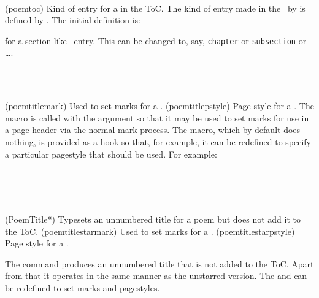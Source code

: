 \begin{syntax}
\cmd{\poemtoc} \\
\end{syntax}
\glossary(poemtoc)%
  {}%
  {Kind of entry for a  in the ToC.}
The kind of entry made in the \toc\ by 
\cmd{\PoemTitle} is defined by \cmd{\poemtoc}. The initial definition is: 
\begin{lcode}
\newcommand{\poemtoc}{section}
\end{lcode}
for a section-like \toc\ entry. This can be changed to, say, \texttt{chapter}
or \texttt{subsection} or \ldots.

\begin{syntax}
\cmd{\poemtitlemark} \\
\cmd{\poemtitlepstyle} \\
\end{syntax}
\glossary(poemtitlemark)%
  {}%
  {Used to set marks for a .}
\glossary(poemtitlepstyle)%
  {}%
  {Page style for a .}
    The macro \cmd{\poemtitlemark}
is called with the argument  so that it may be used
to set marks for use in a page header via the normal mark process. 
The \cmd{\poemtitlepstyle}
macro, which by default does nothing, is provided as a hook so that,
for example, it can be redefined to specify a particular pagestyle that should
be used. For example:
\begin{lcode}
\renewcommand*{\poemtitlemark}[1]{\markboth{#1}{#1}}
\renewcommand*{\poemtitlepstyle}{%
  \pagestyle{headings}%
  \thispagestyle{empty}}
\end{lcode}

\begin{syntax}
\cmd{\PoemTitle*} \\
\cmd{\poemtitlestarmark} \\
\cmd{\poemtitlestarpstyle} \\
\end{syntax}
\glossary(PoemTitle*)%
  {}%
  {Typesets an unnumbered title for a poem but does not add it to the ToC.}
\glossary(poemtitlestarmark)%
  {}%
  {Used to set marks for a .}
\glossary(poemtitlestarpstyle)%
  {}%
  {Page style for a .}

    The \cmd{\PoemTitle*} command produces an unnumbered title that is
not added to the ToC. Apart from that it operates in the same manner
as the unstarred version. The \cmd{\poemtitlestarmark} and 
\cmd{\poemtitlestarpstyle} can be redefined to set marks and pagestyles.

